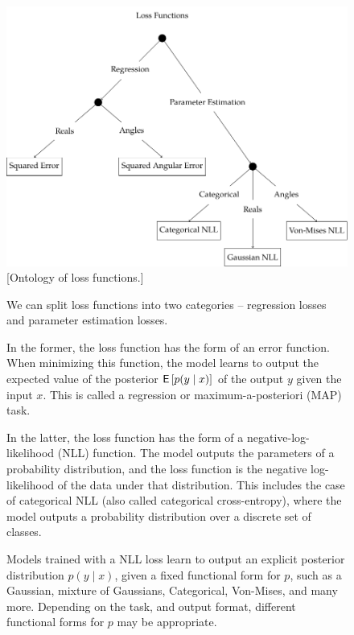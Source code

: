 \begin{figure}
    \centering
        \includegraphics[width=.7\linewidth]{figures/ontology-1-loss.pdf}
        \vspace{1cm}
        \captionsetup{parskip=7pt}
        [Ontology of loss functions.]{We can split loss functions into two categories -- regression losses and parameter estimation losses.

        In the former, the loss function has the form of an error function. When minimizing this function, the model learns to output the expected value of the posterior $\mathsf{E}\left[p(y \mid x)\right]$ of the output $y$ given the input $x$. This is called a regression or maximum-a-posteriori (MAP) task.

        In the latter, the loss function has the form of a negative-log-likelihood (NLL) function. The model outputs the parameters of a probability distribution, and the loss function is the negative log-likelihood of the data under that distribution. This includes the case of categorical NLL (also called categorical cross-entropy), where the model outputs a probability distribution over a discrete set of classes.

        Models trained with a NLL loss learn to output an explicit posterior distribution $p(y \mid x)$, given a fixed functional form for $p$, such as a Gaussian, mixture of Gaussians, Categorical, Von-Mises, and many more. Depending on the task, and output format, different functional forms for $p$ may be appropriate.}
        \label{fig:ontology-loss}
\end{figure}

